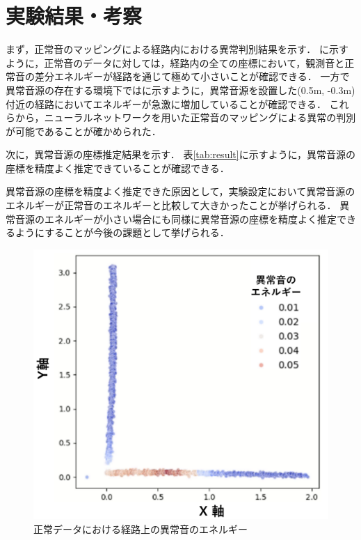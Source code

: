 \documentclass[../main]{subfiles}
\begin{document}
\graphicspath{{../figures}}

\section{実験結果・考察}
まず，正常音のマッピングによる経路内における異常判別結果を示す．
に示すように，正常音のデータに対しては，経路内の全ての座標において，観測音と正常音の差分エネルギーが経路を通じて極めて小さいことが確認できる．
一方で異常音源の存在する環境下ではに示すように，異常音源を設置した(0.5m, -0.3m)付近の経路においてエネルギーが急激に増加していることが確認できる．
これらから，ニューラルネットワークを用いた正常音のマッピングによる異常の判別が可能であることが確かめられた．

次に，異常音源の座標推定結果を示す．
表\ref{tab:result}に示すように，異常音源の座標を精度よく推定できていることが確認できる．

異常音源の座標を精度よく推定できた原因として，実験設定において異常音源のエネルギーが正常音のエネルギーと比較して大きかったことが挙げられる．
異常音源のエネルギーが小さい場合にも同様に異常音源の座標を精度よく推定できるようにすることが今後の課題として挙げられる．

\begin{figure}[tb]
  \centering
  \includegraphics[keepaspectratio, width=0.8\linewidth]{energy_normal.pdf}
  \caption{正常データにおける経路上の異常音のエネルギー}
\end{figure}
\end{document}
